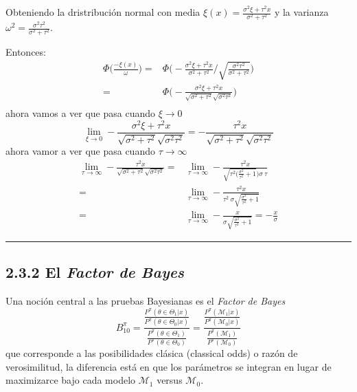 \documentclass[12pt,]{article}
\begin{document}
Obteniendo la dristribución normal con media
\(\xi(x)=\frac{\sigma^2\xi+\tau^2x}{\sigma^2+\tau^2}\) y la varianza
\(\omega^2=\frac{\sigma^2\tau^2}{\sigma^2+\tau^2}\).

Entonces: \[
\begin{array}{rl}
\Phi\bigg(\frac{-\xi(x)}{\omega}\bigg)=&\Phi\Bigg(-\displaystyle \frac{\displaystyle \sigma^2\xi+\tau^2x}{\sigma^2+\tau^2}\Bigg/{\displaystyle\sqrt{\frac{\sigma^2\tau^2}{\sigma^2+\tau^2}}}\Bigg)\\
=&\Phi\Bigg(-\displaystyle \frac{\displaystyle \sigma^2\xi+\tau^2x}{\sqrt{\sigma^2+\tau^2} \sqrt{\sigma^2\tau^2}}\Bigg)\\
\end{array}
\] ahora vamos a ver que pasa cuando \(\xi\to 0\) \[
\lim_{\xi\to 0}-\displaystyle \frac{\displaystyle \sigma^2\xi+\tau^2x}{\sqrt{\sigma^2+\tau^2} \sqrt{\sigma^2\tau^2}}=-\displaystyle \frac{\displaystyle \tau^2x}{\sqrt{\sigma^2+\tau^2} \sqrt{\sigma^2\tau^2}}
\] ahora vamor a ver que pasa cuando \(\tau\to\infty\) \[
\begin{array}{rl}
\displaystyle \lim_{\tau\to\infty} -\displaystyle \frac{\displaystyle \tau^2x}{\sqrt{\sigma^2+\tau^2} \sqrt{\sigma^2\tau^2}}=& \displaystyle \lim_{\tau\to\infty}-\frac{\displaystyle \tau^2x}{\sqrt{\tau^2(\frac{\sigma^2}{\tau^2}+1}) \sigma\ \tau} \\
=&\displaystyle \lim_{\tau\to\infty}-\frac{\displaystyle \tau^2x}{\tau^2\ \sigma \sqrt{\frac{\sigma^2}{\tau^2}+1}}\\
=&\displaystyle \lim_{\tau\to\infty}-\frac{\displaystyle x}{\sigma \sqrt{\frac{\sigma^2}{\tau^2}+1}}=-\frac{x}{\sigma}
\end{array}
\]

\begin{center}\rule{0.5\linewidth}{\linethickness}\end{center}

\subsection{\texorpdfstring{2.3.2 El \emph{Factor de
Bayes}}{2.3.2 El Factor de Bayes}}\label{el-factor-de-bayes}

Una noción central a las pruebas Bayesianas es el \emph{Factor de Bayes}
\[
B_{10}^\pi=\displaystyle \frac{\frac{P^\pi(\theta\in\Theta_1|x)}{P^\pi(\theta\in\Theta_0|x)}}{\frac{P^\pi(\theta\in\Theta_1)}{P^\pi(\theta\in\Theta_0)}}=\displaystyle \frac{\frac{P^\pi(\mathcal{M}_1|x)}{P^\pi(\mathcal{M}_0|x)}}{\frac{P^\pi(\mathcal{M}_1)}{P^\pi(\mathcal{M}_0)}}
\] que corresponde a las posibilidades clásica (classical odds) o razón
de verosimilitud, la diferencia está en que los parámetros se integran
en lugar de maximizarce bajo cada modelo \(\mathcal{M}_1\) versus
\(\mathcal{M}_0\).
\end{document}

